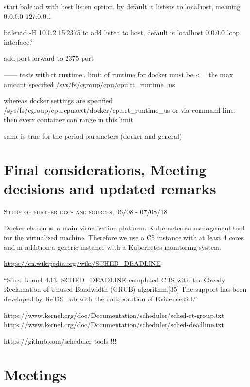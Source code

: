 \documentclass[]{scrartcl}
\begin{document}
start balenad with host listen option, by default it listens to localhost, meaning 0.0.0.0 127.0.0.1

balenad -H 10.0.2.15:2375 to add listen to host, default is localhost 0.0.0.0 loop interface?

add port forward to 2375 port


------
tests with rt runtime..
limit of runtime for docker must be <= the max amount specified
/sys/fs/cgroup/cpu/cpu.rt\_runtime\_us 

whereas docker settings are specified 
/sys/fs/cgroup/cpu,cpuacct/docker/cpu.rt\_runtime\_us
or via command line. then every container can range in this limit

same is true for the period parameters (docker and general)


\section{Final considerations, Meeting decisions and updated remarks}

{\small\textsc{Study of further docs and sources, 06/08 - 07/08/18} \bigskip}

Docker chosen as a main visualization platform. Kubernetes as management tool for the virtualized machine. Therefore we use a C5 instance with at least 4 cores and in addition a generic instance with a Kubernetes monitoring system.

\url{https://en.wikipedia.org/wiki/SCHED_DEADLINE}

``Since kernel 4.13, SCHED\_DEADLINE completed CBS with the Greedy Reclamation of Unused Bandwidth (GRUB) algorithm.[35] The support has been developed by ReTiS Lab with the collaboration of Evidence Srl.''


https://www.kernel.org/doc/Documentation/scheduler/sched-rt-group.txt
https://www.kernel.org/doc/Documentation/scheduler/sched-deadline.txt


https://github.com/scheduler-tools !!!


\section{Meetings}
\end{document}

